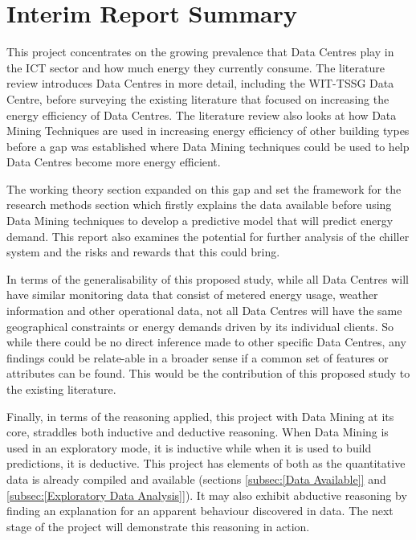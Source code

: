 \documentclass[12pt]{scrartcl}
\begin{document}
\section{Interim Report Summary}
\label{sec:[Interim Report Summary]}
This project concentrates on the growing prevalence that Data Centres play in the ICT sector and how much energy they currently consume. The literature review introduces Data Centres in more detail, including the WIT-TSSG Data Centre, before surveying the existing literature that focused on increasing the energy efficiency of Data Centres.  The literature review also looks at how Data Mining Techniques are used in increasing energy efficiency of other building types before a gap was established where Data Mining techniques could be used to help Data Centres become more energy efficient. 

The working theory section expanded on this gap and set the framework for the research methods section which firstly explains the data available before using Data Mining techniques  to develop a predictive model that will predict energy demand. This report also examines the potential for further analysis of the chiller system and the risks and rewards that this could bring.  

In terms of the generalisability of this proposed study, while all Data Centres will have similar monitoring data that consist of metered energy usage, weather information and other operational data, not all Data Centres will have the same geographical constraints or energy demands driven by its individual clients. So while there could be no direct inference made to other specific Data Centres, any findings could be relate-able in a broader sense if a common set of features or attributes can be found. This would be the contribution of this proposed study to the existing literature.    

Finally, in terms of the reasoning applied, this project with Data Mining at its core, straddles both inductive and deductive reasoning. When Data Mining is used in an exploratory mode, it is inductive while when it is used to build predictions, it is deductive. This project has elements of both as the quantitative data is already compiled and available (sections \ref{subsec:[Data Available]} and \ref{subsec:[Exploratory Data Analysis]}). It may also exhibit abductive reasoning by finding an explanation for an apparent behaviour discovered in data. The next stage of the project will demonstrate this reasoning in action.

\newpage
\printbibliography[heading=bibintoc]
\newpage
\glsaddall
\printglossary
\newpage
\appendix
\appendixpage
\addappheadtotoc
\end{document}

